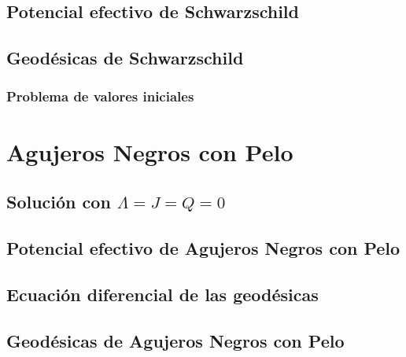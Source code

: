\documentclass[../Main.tex]{subfiles}
\begin{document}
\subsection{Potencial efectivo de Schwarzschild}
\subsection{Geodésicas de Schwarzschild}
\subsubsection{Problema de valores iniciales}
\section{Agujeros Negros con Pelo}
\subsection{Solución con $\Lambda=J=Q=0$}
\subsection{Potencial efectivo de Agujeros Negros con Pelo}
\subsection{Ecuación diferencial de las geodésicas}
\subsection{Geodésicas de Agujeros Negros con Pelo}







\biblio %
\end{document}

